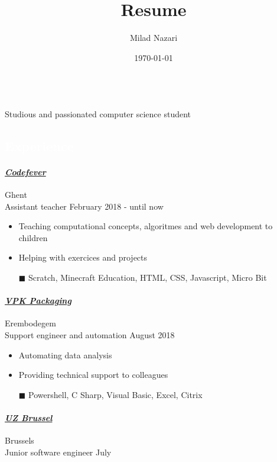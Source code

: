\documentclass[a4paper, twoside]{article} \usepackage[default]{sourcesanspro} \usepackage[margin=0.6in]{geometry} \usepackage{amssymb} \usepackage[T1]{fontenc} \usepackage[utf8]{inputenc} \usepackage{graphicx} \usepackage{float} \usepackage{wrapfig} \usepackage{hyperref} \usepackage[dvipsnames, table]{xcolor} \usepackage{setspace} \usepackage{multirow} \usepackage{booktabs} \usepackage{multicol} \setlength{\multicolsep}{1.0pt} \usepackage{mdframed} \usepackage{xcolor} \usepackage{tabu} \renewcommand{\labelitemi}{\color{blueLight}$\blacksquare$} \renewcommand\labelitemii{$\square$} \definecolor{blueLight}{RGB}{0, 119, 181} \definecolor{blueDark}{RGB}{0, 75, 119} \definecolor{gray}{RGB}{109, 111, 114} \definecolor{grayBorder}{RGB}{202, 204, 206} \definecolor{grayDark}{RGB}{49, 51, 53} \definecolor{grayLight}{RGB}{245, 245, 245} \definecolor{orange}{RGB}{216, 133, 78} \definecolor{white}{RGB}{255, 255, 255} \mdfsetup{ linecolor = blueLight, outerlinewidth = 2pt, skipabove = 0pt, innertopmargin = -10pt, innerbottommargin = 4pt, innerrightmargin = 4pt, innerleftmargin = 4pt, leftmargin = 4pt, rightmargin = 4pt, rightline=false, leftline=false, backgroundcolor=blueLight } \title{Resume} \author{ Milad Nazari } \date{\today} \pagenumbering{gobble}
\begin{document}
 
\begin{multicols}{2}  \\ \noindent Studious and passionated computer science student \paragraph{}  \hfill{}\par \hfill{}\par \hfill{}\par \end{multicols} \begin{mdframed} \section*{\textcolor{white}{ Experience }} \end{mdframed} \paragraph{\textbf{\textit{\href{https://codefever.be }{\textcolor{blueDark}{ Codefever }}}}} \hfill\small Ghent \\ Assistant teacher \hfill\small February 2018 - until now \begin{itemize} \itemsep-0.2em \item Teaching computational concepts, algoritmes and web development to children \item Helping with exercices and projects \item[\color{orange}$\blacksquare$] Scratch, Minecraft Education, HTML, CSS, Javascript, Micro Bit \end{itemize} \paragraph{\textbf{\textit{\href{https://vpkgroup.com }{\textcolor{blueDark}{ VPK Packaging }}}}} \hfill\small Erembodegem \\ Support engineer and automation \hfill\small August 2018 \begin{itemize} \itemsep-0.2em \item Automating data analysis \item Providing technical support to colleagues \item[\color{orange}$\blacksquare$] Powershell, C Sharp, Visual Basic, Excel, Citrix \end{itemize} \paragraph{\textbf{\textit{\href{https://uzbrussel.be }{\textcolor{blueDark}{ UZ Brussel }}}}} \hfill\small Brussels \\ Junior software engineer \hfill\small July 
\end{document}
